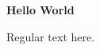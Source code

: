 \documentclass{article}
\begin{document}
{\Large \bf Hello World}

Regular text here.
\end{document}

